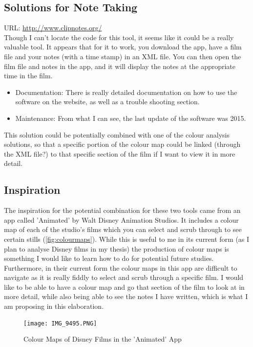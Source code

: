 \documentclass{article}
\begin{document}
\subsection{Solutions for Note Taking}
URL: \url{http://www.clipnotes.org/}\\
Though I can't locate the code for this tool, it seems like it could be a really valuable tool. It appears that for it to work, you download the app, have a film file and your notes (with a time stamp) in an XML file. You can then open the film file and notes in the app, and it will display the notes at the appropriate time in the film.
\begin{itemize}
    \item Documentation: There is really detailed documentation on how to use the software on the website, as well as a trouble shooting section.
    \item Maintenance: From what I can see, the last update of the software was 2015.
\end{itemize}

This solution could be potentially combined with one of the colour analysis solutions, so that a specific portion of the colour map could be linked (through the XML file?) to that specific section of the film if I want to view it in more detail.

\subsection{Inspiration}

The inspiration for the potential combination for these two tools came from an app called 'Animated' by Walt Disney Animation Studios. It includes a colour map of each of the studio's films which you can select and scrub through to see certain stills (\autoref{fig:colourmaps}). While this is useful to me in its current form (as I plan to analyse Disney films in my thesis) the production of colour maps is something I would like to learn how to do for potential future studies. Furthermore, in their current form the colour maps in this app are difficult to navigate as it is really fiddly to select and scrub through a specific film. I would like to be able to have a colour map and go that section of the film to look at in more detail, while also being able to see the notes I have written, which is what I am proposing in this elaboration.

\begin{figure}[htp]
    \centering
    \texttt{[image: IMG\_9495.PNG]}
    \caption{Colour Maps of Disney Films in the 'Animated' App}
    \label{fig:colourmaps}
\end{figure}
\end{document}
